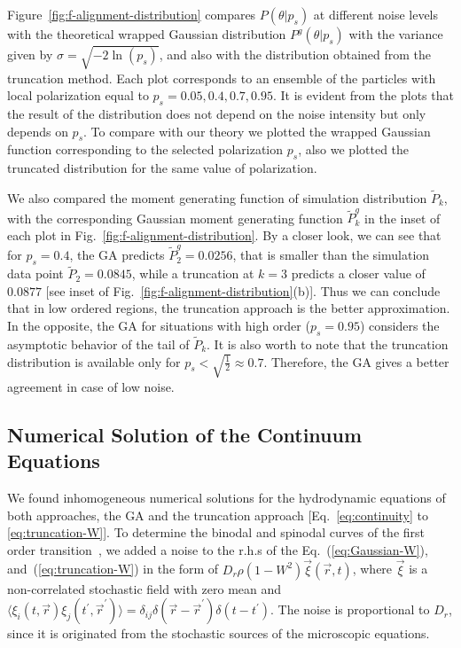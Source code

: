\documentclass[reprint,floatfix,amsmath,amssymb,aps,pre,showkeys,showpacs,superscriptaddress]{revtex4-1}
\newcommand{\ave}[1]{\langle #1 \rangle}
\newcommand{\p}{p}
\newcommand{\w}{W}
\newcommand{\reqs}[2]{Eq.~(\ref{#1}), and~(\ref{#2})}
\begin{document}
Figure~\ref{fig:f-alignment-distribution} compares $P(\theta|p_s)$ at different noise levels with the theoretical wrapped Gaussian distribution $P^g(\theta|p_s)$ with the variance given by $\sigma= \sqrt{-2 \ln(\p_s)}$, and also with the distribution obtained from the truncation method. Each plot corresponds to an ensemble of the particles with local polarization equal to $\p_s=0.05,0.4,0.7,0.95$. It is evident from the plots that the result of the distribution does not depend on the noise intensity but only depends on $\p_s$. To compare with our theory we plotted the wrapped Gaussian function corresponding to the selected polarization $\p_s$, also we plotted the truncated distribution for the same value of polarization. 

We also compared the moment generating function of simulation distribution $\tilde{P}_k$, with the corresponding Gaussian moment generating function $\tilde{P}^{g}_k$ in the inset of each plot in Fig.~\ref{fig:f-alignment-distribution}. By a closer look, we can see that for $\p_s = 0.4$, the GA predicts $\tilde{P}^g_2= 0.0256$, that is smaller than the simulation data point $\tilde{P}_2 = 0.0845$, while a truncation at $k=3$ predicts a closer value of $0.0877$ [see inset of Fig.~\ref{fig:f-alignment-distribution}(b)]. Thus we can conclude that in low ordered regions, the truncation approach is the better approximation. In the opposite, the GA for situations with high order ($\p_s=0.95$) considers the asymptotic behavior of the tail of $\tilde{P}_k$. It is also worth to note that the truncation distribution is available only for $\p_s < \sqrt{\frac{1}{2}} \approx 0.7$. Therefore, the GA gives a better agreement in case of low noise.

\subsection{Numerical Solution of the Continuum Equations}
\label{subsec:PDE-solution}

We found inhomogeneous numerical solutions for the hydrodynamic equations of both approaches, the GA and the truncation approach [Eq.~\eqref{eq:continuity} to \eqref{eq:truncation-W}]. To determine the binodal and spinodal curves of the first order transition~\cite{solon2015from}, we added a noise to the r.h.s of the \reqs{eq:Gaussian-W}{eq:truncation-W} in the form of $D_r \rho (1-\w^2) \vec{\xi}(\vec{r},t)$, where $\vec{\xi}$ is a non-correlated stochastic field with zero mean and $\ave{\xi_i(t,\vec{r}) \xi_j(t^\prime,\vec{r}^\prime)} = \delta_{ij} \delta(\vec{r} - \vec{r}^\prime) \delta (t - t^\prime)$. The noise is proportional to $D_r$, since it is originated from the stochastic sources of the microscopic equations. 
\end{document}
